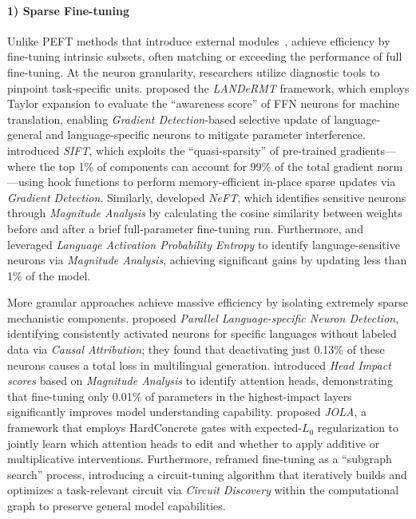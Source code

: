 \documentclass[11pt,letterpaper]{mystyle}
\begin{document}
  \paragraph {1) Sparse Fine-tuning} Unlike PEFT methods that introduce external modules~\citep{li2021prefixtuningoptimizingcontinuousprompts,hu2022lora,liu-etal-2022-p}, achieve efficiency by fine-tuning intrinsic subsets, often matching or exceeding the performance of full fine-tuning.
  At the neuron granularity, researchers utilize diagnostic tools to pinpoint task-specific units. 
  \citet{zhu-etal-2024-landermt} proposed the \textit{LANDeRMT} framework, which employs Taylor expansion to evaluate the ``awareness score'' of FFN neurons for machine translation, enabling \textit{Gradient Detection}-based selective update of language-general and language-specific neurons to mitigate parameter interference. 
  \citet{song-etal-2024-sift} introduced \textit{SIFT}, which exploits the ``quasi-sparsity'' of pre-trained gradients—where the top 1\% of components can account for 99\% of the total gradient norm—using hook functions to perform memory-efficient in-place sparse updates via \textit{Gradient Detection}. 
  Similarly, \citet{xu-etal-2025-lets} developed \textit{NeFT}, which identifies sensitive neurons through \textit{Magnitude Analysis} by calculating the cosine similarity between weights before and after a brief full-parameter fine-tuning run. 
  Furthermore, \citet{mondal-etal-2025-language} and \citet{gurgurov2025sparsesubnetworkenhancementunderrepresented} leveraged \textit{Language Activation Probability Entropy} \citep{tang-etal-2024-language} to identify language-sensitive neurons via \textit{Magnitude Analysis}, achieving significant gains by updating less than 1\% of the model. 
  
  More granular approaches achieve massive efficiency by isolating extremely sparse mechanistic components. 
  \citet{zhao-etal-2024-multilingual} proposed \textit{Parallel Language-specific Neuron Detection}, identifying consistently activated neurons for specific languages without labeled data via \textit{Causal Attribution}; they found that deactivating just 0.13\% of these neurons causes a total loss in multilingual generation. 
  \citet{sergeev2025optimizingmultimodallanguagemodels} introduced \textit{Head Impact scores} based on \textit{Magnitude Analysis} to identify attention heads, demonstrating that fine-tuning only 0.01\% of parameters in the highest-impact layers significantly improves model understanding capability. 
  \citet{lai2025jola} proposed \textit{JOLA}, a framework that employs HardConcrete gates with expected-$L_0$ regularization to jointly learn which attention heads to edit and whether to apply additive or multiplicative interventions. 
  Furthermore, \citet{li2025finetuningsubgraphsearchnew} reframed fine-tuning as a ``subgraph search'' process, introducing a circuit-tuning algorithm that iteratively builds and optimizes a task-relevant circuit via \textit{Circuit Discovery} within the computational graph to preserve general model capabilities.
  
\end{document}
